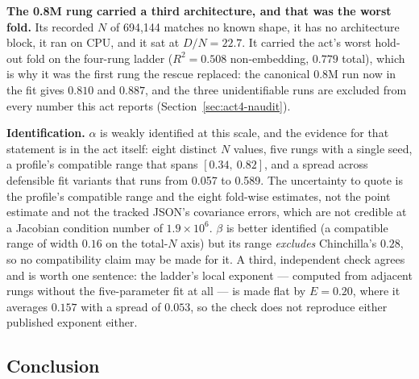 \documentclass[11pt,a4paper]{article}
\begin{document}
\textbf{The 0.8M rung carried a third architecture, and that was the worst
fold.} Its recorded $N$ of 694,144 matches no known shape, it has no
architecture block, it ran on CPU, and it sat at $D/N = 22.7$. It carried the
act's worst hold-out fold on the four-rung ladder ($R^2 = 0.508$
non-embedding, $0.779$ total), which is why it was the first rung the rescue
replaced: the canonical 0.8M run now in the fit gives $0.810$ and $0.887$, and
the three unidentifiable runs are excluded from every number this act reports
(Section~\ref{sec:act4-naudit}). %

\textbf{Identification.} $\alpha$ is weakly identified at this scale, and the
evidence for that statement is in the act itself: eight distinct $N$ values,
five rungs with a single seed, a profile's compatible range that spans
$[0.34,\ 0.82]$, and a spread across defensible fit variants that runs from
0.057 to 0.589. The uncertainty to quote is the profile's compatible range
and the eight fold-wise estimates, not the point estimate and not the tracked
JSON's covariance errors, which are not credible at a Jacobian condition
number of $1.9\times10^{6}$. $\beta$ is better identified (a compatible range
of width $0.16$ on the total-$N$ axis) but its range \emph{excludes}
Chinchilla's $0.28$, so no compatibility claim may be made for it.
A third, independent check agrees and is worth one sentence: the ladder's
local exponent --- computed from adjacent rungs without the five-parameter fit
at all --- is made flat by $E = 0.20$, where it averages $0.157$ with a spread
of $0.053$, so the check does not reproduce either published exponent either.

\subsection{Conclusion}
\label{sec:act4-conclusion}
\end{document}
